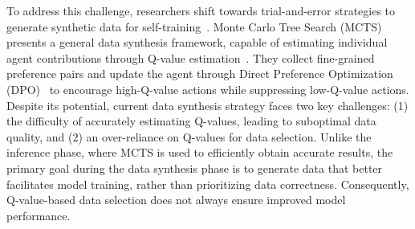 To address this challenge, researchers shift towards trial-and-error strategies to generate synthetic data for self-training~\cite{DBLP:conf/acl/SongYYHLL24}. 
Monte Carlo Tree Search (MCTS)~\cite{guan2025rstarmathsmallllmsmaster, li2025enhancingreasoningprocesssupervision} presents a general data synthesis framework, capable of estimating individual agent contributions through Q-value estimation~\cite{DBLP:journals/corr/abs-2410-08115}. They collect fine-grained preference pairs and update the agent through Direct Preference Optimization (DPO)~\cite{DBLP:conf/nips/RafailovSMMEF23} to encourage high-Q-value actions while suppressing low-Q-value actions. Despite its potential, current data synthesis strategy faces two key challenges: (1) the difficulty of accurately estimating Q-values, leading to suboptimal data quality, and (2) an over-reliance on Q-values for data selection. Unlike the inference phase, where MCTS is used to efficiently obtain accurate results, the primary goal during the data synthesis phase is to generate data that better facilitates model training, rather than prioritizing data correctness. Consequently, Q-value-based data selection does not always ensure improved model performance.



